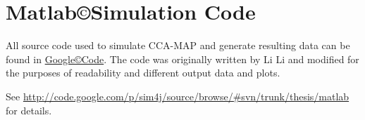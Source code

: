 \chapter{Matlab\copyright Simulation Code}

All source code used to simulate CCA-MAP and generate resulting data can be found in \href{http://code.google.com}{Google\copyright Code}.  The code was originally written by Li Li and modified for the purposes of readability and different output data and plots.

See \url{http://code.google.com/p/sim4j/source/browse/#svn/trunk/thesis/matlab} for details.

